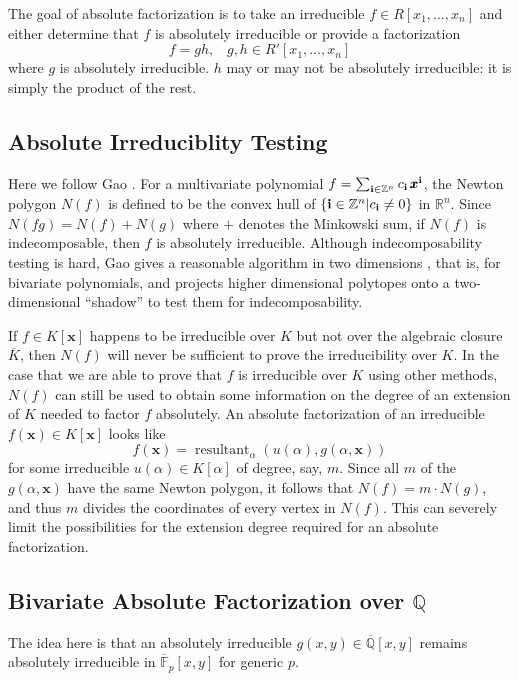 \documentclass[11pt,reqno]{amsart}
\numberwithin{equation}{section}
\begin{document}
The goal of absolute factorization is to take an irreducible $f \in R[x_1,
\dots, x_n]$ and either determine that $f$ is absolutely irreducible or provide
a factorization
\begin{equation*}
f = g h \text{,} \quad g, h \in R'[x_1, \dots, x_n]
\end{equation*}
where $g$ is absolutely irreducible. $h$ may or may not be absolutely
irreducible: it is simply the product of the rest.

\subsection{Absolute Irreduciblity Testing}
Here we follow Gao \cite{GAO}. For a multivariate polynomial $f =
\sum_{\bold{i} \in \mathbb{Z}^n}{c_{\bold{i}} \, \pmb{x}^{\bold{i}}}$, the
Newton polygon $N(f)$ is defined to be the convex hull of $\{\bold{i} \in
\mathbb{Z}^n | c_{\bold{i}} \ne 0\}$ in $\mathbb{R}^n$.
Since $N(fg) = N(f) + N(g)$ where $+$ denotes the Minkowski sum, if $N(f)$ is
indecomposable, then $f$ is absolutely irreducible. Although indecomposability
testing is hard, Gao gives a reasonable algorithm in two dimensions
\cite{GAO2}, that is, for bivariate polynomials, and projects higher
dimensional polytopes onto a two-dimensional ``shadow'' to test them for
indecomposability.

If $f \in K[\pmb{x}]$ happens to be irreducible over $K$ but not over the
algebraic closure $\overline{K}$, then $N(f)$ will never be sufficient to prove
the irreducibility over $K$. In the case that we are able to prove that $f$ is
irreducible over $K$ using other methods, $N(f)$ can still be used to obtain
some information on the degree of an extension of $K$ needed to factor $f$
absolutely. An absolute factorization of an irreducible $f(\pmb{x}) \in
K[\pmb{x}]$ looks like
\begin{equation*}
f(\pmb{x}) = \operatorname{resultant}_{\alpha} (u(\alpha), g(\alpha, \pmb{x}))
\end{equation*}
for some irreducible $u(\alpha) \in K[\alpha]$ of degree, say, $m$. Since all
$m$ of the $g(\alpha, \pmb{x})$ have the same Newton polygon, it follows that
$N(f)=m\cdot N(g)$, and thus $m$ divides the coordinates of every vertex in
$N(f)$. This can severely limit the possibilities for the extension degree
required for an absolute factorization.

\subsection{Bivariate Absolute Factorization over $\mathbb{Q}$}
The idea here is that an absolutely irreducible $g(x,y) \in
\overline{\mathbb{Q}}[x,y]$ remains absolutely irreducible in
$\overline{\mathbb{F}}_p[x,y]$ for generic $p$.
\end{document}
